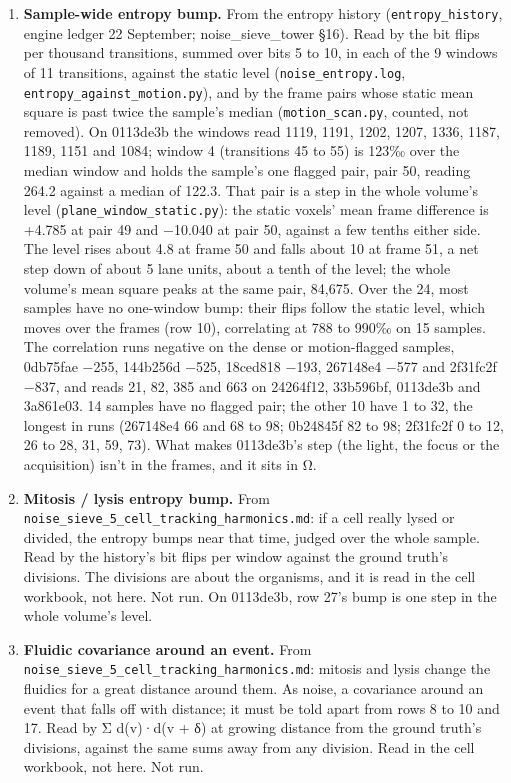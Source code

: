 \begin{enumerate}
\item \textbf{Sample-wide entropy bump.} From the entropy history (\texttt{entropy\_\allowbreak{}history}, engine ledger 22 September; noise\_\allowbreak{}sieve\_\allowbreak{}tower §16). Read by the bit flips per thousand transitions, summed over bits 5 to 10, in each of the 9 windows of 11 transitions, against the static level (\texttt{noise\_\allowbreak{}entropy.\allowbreak{}log}, \texttt{entropy\_\allowbreak{}against\_\allowbreak{}motion.\allowbreak{}py}), and by the frame pairs whose static mean square is past twice the sample's median (\texttt{motion\_\allowbreak{}scan.\allowbreak{}py}, counted, not removed). On 0113de3b the windows read 1119, 1191, 1202, 1207, 1336, 1187, 1189, 1151 and 1084; window 4 (transitions 45 to 55) is 123‰ over the median window and holds the sample's one flagged pair, pair 50, reading 264.2 against a median of 122.3. That pair is a step in the whole volume's level (\texttt{plane\_\allowbreak{}window\_\allowbreak{}static.\allowbreak{}py}): the static voxels' mean frame difference is +4.785 at pair 49 and −10.040 at pair 50, against a few tenths either side. The level rises about 4.8 at frame 50 and falls about 10 at frame 51, a net step down of about 5 lane units, about a tenth of the level; the whole volume's mean square peaks at the same pair, 84,675. Over the 24, most samples have no one-window bump: their flips follow the static level, which moves over the frames (row 10), correlating at 788 to 990‰ on 15 samples. The correlation runs negative on the dense or motion-flagged samples, 0db75fae −255, 144b256d −525, 18ced818 −193, 267148e4 −577 and 2f31fc2f −837, and reads 21, 82, 385 and 663 on 24264f12, 33b596bf, 0113de3b and 3a861e03. 14 samples have no flagged pair; the other 10 have 1 to 32, the longest in runs (267148e4 66 and 68 to 98; 0b24845f 82 to 98; 2f31fc2f 0 to 12, 26 to 28, 31, 59, 73). What makes 0113de3b's step (the light, the focus or the acquisition) isn't in the frames, and it sits in Ω.
\item \textbf{Mitosis / lysis entropy bump.} From \texttt{noise\_\allowbreak{}sieve\_\allowbreak{}5\_\allowbreak{}cell\_\allowbreak{}tracking\_\allowbreak{}harmonics.\allowbreak{}md}: if a cell really lysed or divided, the entropy bumps near that time, judged over the whole sample. Read by the history's bit flips per window against the ground truth's divisions. The divisions are about the organisms, and it is read in the cell workbook, not here. Not run. On 0113de3b, row 27's bump is one step in the whole volume's level.
\item \textbf{Fluidic covariance around an event.} From \texttt{noise\_\allowbreak{}sieve\_\allowbreak{}5\_\allowbreak{}cell\_\allowbreak{}tracking\_\allowbreak{}harmonics.\allowbreak{}md}: mitosis and lysis change the fluidics for a great distance around them. As noise, a covariance around an event that falls off with distance; it must be told apart from rows 8 to 10 and 17. Read by Σ d(v)·d(v + δ) at growing distance from the ground truth's divisions, against the same sums away from any division. Read in the cell workbook, not here. Not run.

\end{enumerate}
